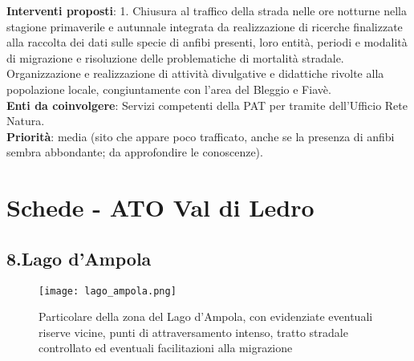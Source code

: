 \documentclass[11pt,a4paper,twoside]{memoir}
\begin{document}
\textbf{Interventi proposti}: 1. Chiusura al traffico della strada nelle ore notturne nella stagione primaverile e autunnale integrata da realizzazione di ricerche finalizzate alla raccolta dei dati sulle specie di anfibi presenti, loro entità, periodi e modalità di migrazione e risoluzione delle problematiche di mortalità stradale. Organizzazione e realizzazione di attività divulgative e didattiche rivolte alla popolazione locale, congiuntamente con l’area del Bleggio e Fiavè. \\
\textbf{Enti da coinvolgere}: Servizi competenti della PAT per tramite dell’Ufficio Rete Natura. \\
\textbf{Priorità}: media (sito che appare poco trafficato, anche se la presenza di anfibi sembra abbondante; da approfondire le conoscenze). \\



\newpage
\section{Schede - ATO Val di Ledro}
\begin{tcolorbox}[breakable,colback=white,colframe=green,width=10cm]
\subsection{8.Lago d'Ampola}
\end{tcolorbox}

\begin{figure}[H]
\label{fig:map_ampola}
\centering
  \texttt{[image: lago\_ampola.png]}
\caption{Particolare della zona del Lago d'Ampola, con evidenziate eventuali riserve vicine, punti di attraversamento intenso, tratto stradale controllato ed eventuali facilitazioni alla migrazione}
\end{figure}
\end{document}

